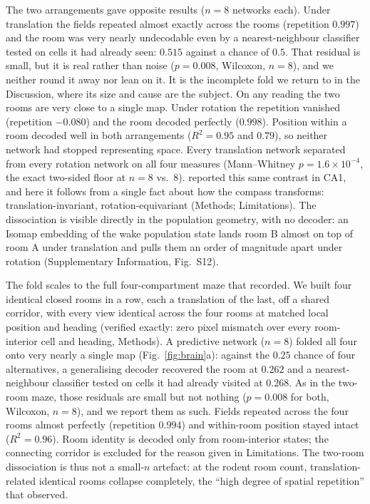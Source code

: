 The two arrangements gave opposite results ($n=8$ networks each). Under translation the fields
repeated almost exactly across the rooms (repetition $0.997$) and the room was very nearly
undecodable even by a nearest-neighbour classifier tested on cells it had already seen: $0.515$
against a chance of $0.5$. That residual is small, but it is real rather than noise ($p = 0.008$,
Wilcoxon, $n = 8$), and we neither round it away nor lean on it. It is the incomplete fold we
return to in the Discussion, where its size and cause are the subject. On any reading the two rooms
are very close to a single map. Under rotation the repetition vanished (repetition $-0.080$) and the
room decoded perfectly ($0.998$). Position within a room decoded well in both arrangements
($R^2 = 0.95$ and $0.79$), so neither network had stopped representing space. Every translation
network separated from every rotation network on all four measures (Mann--Whitney
$p = 1.6\times10^{-4}$, the exact two-sided floor at $n=8$ vs.\ $8$). \citet{grieves2016} reported
this same contrast in CA1, and here it follows from a single fact about how the compass transforms:
translation-invariant, rotation-equivariant (Methods; Limitations). The dissociation is visible
directly in the population geometry, with no decoder: an Isomap embedding of the wake population
state lands room B almost on top of room A under translation and pulls them an order of magnitude
apart under rotation (Supplementary Information, Fig.~S12).

The fold scales to the full four-compartment maze that \citet{spiers2015} recorded. We built four
identical closed rooms in a row, each a translation of the last, off a shared corridor, with every
view identical across the four rooms at matched local position and heading (verified exactly: zero
pixel mismatch over every room-interior cell and heading, Methods). A predictive network ($n=8$)
folded all four onto very nearly a single map (Fig.~\ref{fig:brain}a): against the $0.25$ chance of four alternatives, a
generalising decoder recovered the room at $0.262$ and a nearest-neighbour classifier tested on
cells it had already visited at $0.268$. As in the two-room maze, those residuals are small but not
nothing ($p = 0.008$ for both, Wilcoxon, $n = 8$), and we report them as such. Fields repeated across
the four rooms almost perfectly (repetition $0.994$) and within-room position stayed intact
($R^2 = 0.96$). Room identity is decoded only from room-interior states; the connecting corridor is
excluded for the reason given in Limitations. The two-room dissociation is thus not a small-$n$
artefact: at the rodent room count, translation-related identical rooms collapse completely, the
``high degree of spatial repetition'' that \citet{spiers2015} observed.

